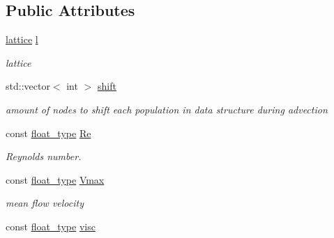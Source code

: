 \subsection*{\-Public \-Attributes}
\begin{DoxyCompactItemize}
\item 
\hypertarget{classlb_1_1simulation_a194e64cb51273bf024b024725176c9a8}{\hyperlink{classlb_1_1lattice}{lattice} \hyperlink{classlb_1_1simulation_a194e64cb51273bf024b024725176c9a8}{l}}\label{classlb_1_1simulation_a194e64cb51273bf024b024725176c9a8}

\begin{DoxyCompactList}\small\item\em lattice \end{DoxyCompactList}\item 
\hypertarget{classlb_1_1simulation_a5e058ddd59cb1239568130b3d3e075ed}{std\-::vector$<$ int $>$ \hyperlink{classlb_1_1simulation_a5e058ddd59cb1239568130b3d3e075ed}{shift}}\label{classlb_1_1simulation_a5e058ddd59cb1239568130b3d3e075ed}

\begin{DoxyCompactList}\small\item\em amount of nodes to shift each population in data structure during advection \end{DoxyCompactList}\item 
\hypertarget{classlb_1_1simulation_a6a4498379a1d650e6853826388bd7d30}{const \hyperlink{namespacelb_a2b37d1585aef2d3da421ad0aedc6b11b}{float\-\_\-type} \hyperlink{classlb_1_1simulation_a6a4498379a1d650e6853826388bd7d30}{\-Re}}\label{classlb_1_1simulation_a6a4498379a1d650e6853826388bd7d30}

\begin{DoxyCompactList}\small\item\em \-Reynolds number. \end{DoxyCompactList}\item 
\hypertarget{classlb_1_1simulation_ae18bfd487d2408bc6c48688033e2ccaf}{const \hyperlink{namespacelb_a2b37d1585aef2d3da421ad0aedc6b11b}{float\-\_\-type} \hyperlink{classlb_1_1simulation_ae18bfd487d2408bc6c48688033e2ccaf}{\-Vmax}}\label{classlb_1_1simulation_ae18bfd487d2408bc6c48688033e2ccaf}

\begin{DoxyCompactList}\small\item\em mean flow velocity \end{DoxyCompactList}\item 
\hypertarget{classlb_1_1simulation_ac2b3c541adeb249d9c19b63269d2d89f}{const \hyperlink{namespacelb_a2b37d1585aef2d3da421ad0aedc6b11b}{float\-\_\-type} \hyperlink{classlb_1_1simulation_ac2b3c541adeb249d9c19b63269d2d89f}{visc}}\label{classlb_1_1simulation_ac2b3c541adeb249d9c19b63269d2d89f}


\end{DoxyCompactItemize}
